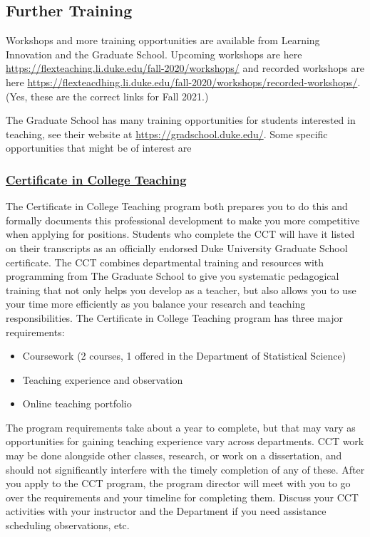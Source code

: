 \documentclass[
]{article}
\begin{document}
\hypertarget{further-training}{%
\subsection{Further Training}\label{further-training}}

Workshops and more training opportunities are available from Learning Innovation and the Graduate School. Upcoming workshops are here \url{https://flexteaching.li.duke.edu/fall-2020/workshops/} and recorded workshops are here \url{https://flexteacdhing.li.duke.edu/fall-2020/workshops/recorded-workshops/}. (Yes, these are the correct links for Fall 2021.)

The Graduate School has many training opportunities for students interested in teaching, see their website at \url{https://gradschool.duke.edu/}. Some specific opportunities that might be of interest are

\hypertarget{certificate-in-college-teaching}{%
\subsubsection{\texorpdfstring{\href{https://gradschool.duke.edu/professional-development/programs/certificate-college-teaching}{Certificate in College Teaching}}{Certificate in College Teaching}}\label{certificate-in-college-teaching}}

The Certificate in College Teaching program both prepares you to do this and formally documents this professional development to make you more competitive when applying for positions. Students who complete the CCT will have it listed on their transcripts as an officially endorsed Duke University Graduate School certificate. The CCT combines departmental training and resources with programming from The Graduate School to give you systematic pedagogical training that not only helps you develop as a teacher, but also allows you to use your time more efficiently as you balance your research and teaching responsibilities. The Certificate in College Teaching program has three major requirements:

\begin{itemize}
\item
  Coursework (2 courses, 1 offered in the Department of Statistical Science)
\item
  Teaching experience and observation
\item
  Online teaching portfolio
\end{itemize}

The program requirements take about a year to complete, but that may vary as opportunities for gaining teaching experience vary across departments. CCT work may be done alongside other classes, research, or work on a dissertation, and should not significantly interfere with the timely completion of any of these. After you apply to the CCT program, the program director will meet with you to go over the requirements and your timeline for completing them. Discuss your CCT activities with your instructor and the Department if you need assistance scheduling observations, etc.
\end{document}

